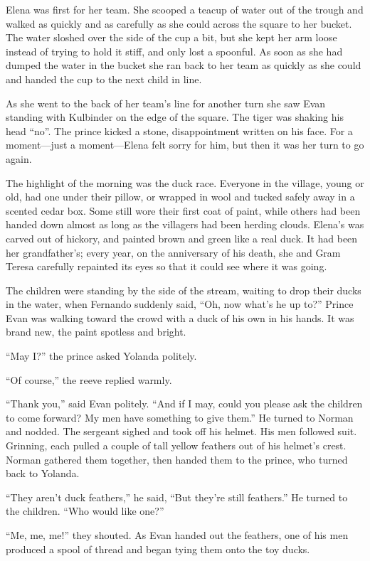 \documentclass[10pt]{book}
\begin{document}
Elena was first for her team. She scooped a teacup of water out of the trough and walked as quickly and as carefully as she could across the square to her bucket. The water sloshed over the side of the cup a bit, but she kept her arm loose instead of trying to hold it stiff, and only lost a spoonful. As soon as she had dumped the water in the bucket she ran back to her team as quickly as she could and handed the cup to the next child in line.

As she went to the back of her team's line for another turn she saw Evan standing with Kulbinder on the edge of the square. The tiger was shaking his head ``no''. The prince kicked a stone, disappointment written on his face. For a moment---just a moment---Elena felt sorry for him, but then it was her turn to go again.

The highlight of the morning was the duck race. Everyone in the village, young or old, had one under their pillow, or wrapped in wool and tucked safely away in a scented cedar box. Some still wore their first coat of paint, while others had been handed down almost as long as the villagers had been herding clouds. Elena's was carved out of hickory, and painted brown and green like a real duck. It had been her grandfather's; every year, on the anniversary of his death, she and Gram Teresa carefully repainted its eyes so that it could see where it was going.

The children were standing by the side of the stream, waiting to drop their ducks in the water, when Fernando suddenly said, ``Oh, now what's he up to?'' Prince Evan was walking toward the crowd with a duck of his own in his hands. It was brand new, the paint spotless and bright.

``May I?'' the prince asked Yolanda politely.

``Of course,'' the reeve replied warmly.

``Thank you,'' said Evan politely. ``And if I may, could you please ask the children to come forward? My men have something to give them.'' He turned to Norman and nodded. The sergeant sighed and took off his helmet. His men followed suit. Grinning, each pulled a couple of tall yellow feathers out of his helmet's crest. Norman gathered them together, then handed them to the prince, who turned back to Yolanda.

``They aren't duck feathers,'' he said, ``But they're still feathers.'' He turned to the children. ``Who would like one?''

``Me, me, me!'' they shouted. As Evan handed out the feathers, one of his men produced a spool of thread and began tying them onto the toy ducks.
\end{document}
